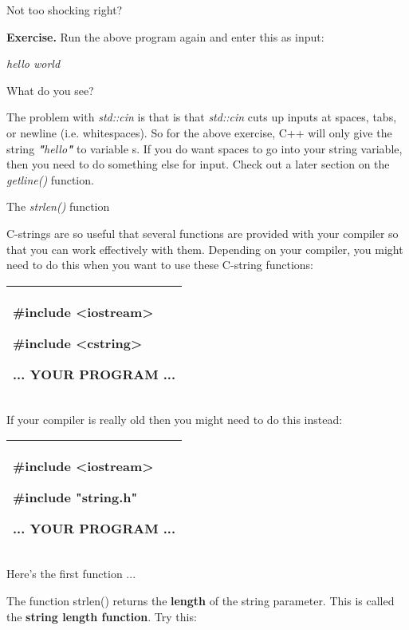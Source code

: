 \documentclass[
]{article}
\begin{document}
Not too shocking right?

\textbf{Exercise.} Run the above program again and enter this as input:

\emph{hello world}

What do you see?

The problem with \emph{std::cin} is that is that \emph{std::cin} cuts up
inputs at spaces, tabs, or newline (i.e. whitespaces). So for the above
exercise, C++ will only give the string \emph{\textbf{"}hello\textbf{"}}
to variable s. If you do want spaces to go into your string variable,
then you need to do something else for input. Check out a later section
on the \emph{getline()} function.

The \emph{strlen()} function

C-strings are so useful that several functions are provided with your
compiler so that you can work effectively with them. Depending on your
compiler, you might need to do this when you want to use these C-string
functions:

\begin{longtable}[]{@{}l@{}}
\toprule
\endhead
\begin{minipage}[t]{0.97\columnwidth}\raggedright
\#include \textless iostream\textgreater{}

\#include \textless cstring\textgreater{}

... YOUR PROGRAM ...\strut
\end{minipage}\tabularnewline
\bottomrule
\end{longtable}

If your compiler is really old then you might need to do this instead:

\begin{longtable}[]{@{}l@{}}
\toprule
\endhead
\begin{minipage}[t]{0.97\columnwidth}\raggedright
\#include \textless iostream\textgreater{}

\#include "string.h"

... YOUR PROGRAM ...\strut
\end{minipage}\tabularnewline
\bottomrule
\end{longtable}

Here's the first function ...

The function strlen() returns the \textbf{length} of the string
parameter. This is called the \textbf{string length function}. Try this:
\end{document}
